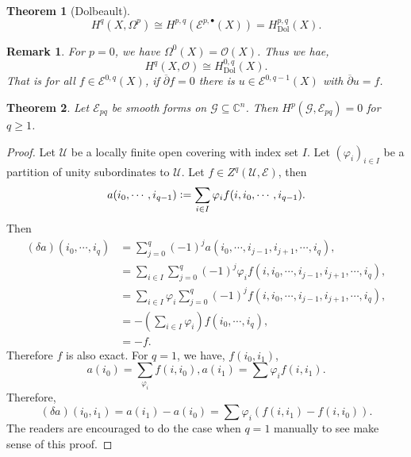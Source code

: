 \documentclass{article}
\newtheorem{theorem}{Theorem} [section]
\newtheorem{remark}{Remark}[section]
\DeclareMathOperator{\Dol}{Dol}
\newcommand{\defeq}{\vcentcolon=}
\newcommand{\cE}[0]{\mathcal{E}}
\newcommand{\sU}[0]{\mathscr{U}}
\newcommand{\C}[0]{\mathbb{C}}
\newcommand{\G}[0]{\mathcal{G}}
\newcommand{\Ouv}[0]{\mathcal{O}}
\begin{document}
\begin{theorem}[Dolbeault]
  \begin{equation*}
    H^q(X,\Omega^p)\cong H^{p,q}(\cE^{p,\bullet}(X)) = H^{p,q}_{\Dol}(X).
  \end{equation*}
\end{theorem}

\begin{remark}
  For $p=0$, we have $\Omega^0(X)=\Ouv(X)$. Thus we hae,
  \begin{equation*}
    H^q(X,\Ouv) \cong H^{0,q}_{\Dol}(X).
  \end{equation*}
  That is for all $f\in\cE^{0,q}(X)$, if $\overline{\partial}f=0$ there is $u\in\cE^{0,q-1}(X)$ with $\overline{\partial}u = f$.
\end{remark}

\begin{theorem}
  Let $\mathcal{E}_{pq}$ be smooth forms on $\G\subseteq\C^n$. Then $H^p(\G,\mathcal{E}_{pq})=0$ for $q\geq1$. 
\end{theorem}

\begin{proof}
  Let $\sU$ be a locally finite open covering with index set $I$. Let $(\varphi_i)_{i\in I}$ be a partition of unity subordinates to $\sU$. 
  Let $f\in Z^q(\sU,\mathcal{E})$, then 
  \begin{equation*}
    a(i_0,\cdots,i_{q-1}) \defeq \sum_{i\in I}\varphi_if(i,i_0,\cdots,i_{q-1}).
  \end{equation*}
  Then 
  \begin{align*}
    (\delta a)(i_0,\cdots,i_q) & = \sum_{j=0}^q(-1)^ja(i_0,\cdots,i_{j-1},i_{j+1},\cdots,i_q),\\
    & = \sum_{i\in I}\sum_{j=0}^q(-1)^j\varphi_if(i,i_0,\cdots,i_{j-1},i_{j+1},\cdots,i_q),\\
    & = \sum_{i\in I}\varphi_i\sum_{j=0}^q (-1)^j f(i,i_0,\cdots,i_{j-1},i_{j+1},\cdots,i_q),\\
    & = -\left(\sum_{i\in I}\varphi_i\right) f(i_0,\cdots,i_q),\\
    & = -f.
  \end{align*}
  Therefore $f$ is also exact. For $q=1$, we have, $f(i_0,i_1)$, 
  \begin{equation*}
    a(i_0) = \sum_{\varphi_i}f(i,i_0), a(i_1) = \sum\varphi_if(i,i_1). 
  \end{equation*}
  Therefore,
  \begin{equation*}
    (\delta a)(i_0,i_1) = a(i_1)-a(i_0) = \sum\varphi_i(f(i,i_1)-f(i,i_0)).
  \end{equation*}
  The readers are encouraged to do the case when $q=1$ manually to see make sense of this proof.
\end{proof}
\end{document}
